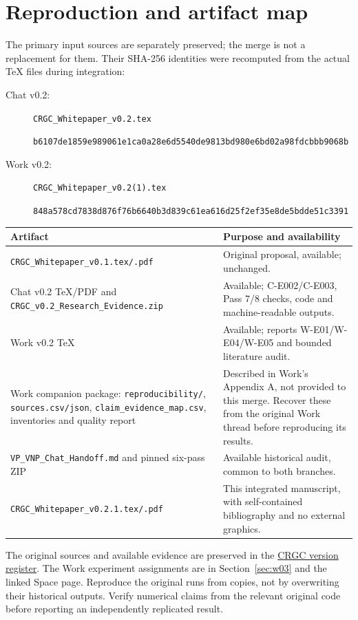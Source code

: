 \documentclass[11pt,letterpaper]{article}
\begin{document}
\section{Reproduction and artifact map}
\label{app:artifacts}
The primary input sources are separately preserved; the merge is not a replacement for them. Their SHA-256 identities were recomputed from the actual TeX files during integration:
\begin{description}
\item[Chat v0.2:] \texttt{CRGC\_Whitepaper\_v0.2.tex}\par\small\texttt{b6107de1859e989061e1ca0a28e6d5540}\newline\texttt{de9813bd980e6bd02a98fdcbbb9068b}\normalsize
\item[Work v0.2:] \texttt{CRGC\_Whitepaper\_v0.2(1).tex}\par\small\texttt{848a578cd7838d876f76b6640b3d839c6}\newline\texttt{1ea616d25f2ef35e8de5bdde51c3391}\normalsize
\end{description}
\begin{longtable}{P{.42\linewidth}P{.49\linewidth}}
\toprule Artifact & Purpose and availability\\\midrule\endhead
\texttt{CRGC\_Whitepaper\_v0.1.tex/.pdf} & Original proposal, available; unchanged.\\
Chat v0.2 TeX/PDF and \texttt{CRGC\_v0.2\_Research\_Evidence.zip} & Available; C-E002/C-E003, Pass 7/8 checks, code and machine-readable outputs.\\
Work v0.2 TeX & Available; reports W-E01/W-E04/W-E05 and bounded literature audit.\\
Work companion package: \texttt{reproducibility/}, \texttt{sources.csv/json}, \texttt{claim\_evidence\_map.csv}, inventories and quality report & Described in Work's Appendix A, not provided to this merge. Recover these from the original Work thread before reproducing its results.\\
\texttt{VP\_VNP\_Chat\_Handoff.md} and pinned six-pass ZIP & Available historical audit, common to both branches.\\
\texttt{CRGC\_Whitepaper\_v0.2.1.tex/.pdf} & This integrated manuscript, with self-contained bibliography and no external graphics.\\
\bottomrule
\end{longtable}
The original sources and available evidence are preserved in the \href{https://chatgpt.com/space/page_c22eca223fc88191a109ba88e518d954}{CRGC version register}. The Work experiment assignments are in Section~\ref{sec:w03} and the linked Space page. Reproduce the original runs from copies, not by overwriting their historical outputs. Verify numerical claims from the relevant original code before reporting an independently replicated result.
\end{document}
